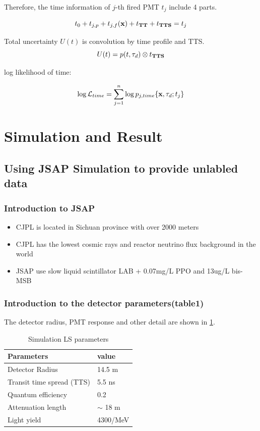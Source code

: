 \documentclass{article}
\begin{document}
	Therefore, the time information of $j$-th fired PMT $t_j$ include 4 parts. 

	\begin{equation}
	\numberwithin{equation}{section}
	t_{0} + t_{j,p} + t_{j,f}({\textbf x}) +  t_{\textbf{TT}} + t_{\textbf{TTS}}= t_{j} 
	\end{equation}	
	
	\par Total uncertainty $U(t)$ is convolution by time profile and TTS.
	\begin{equation}
	\numberwithin{equation}{section}
		U(t) =  p(t,\tau_d)\otimes t_{\textbf{TTS}}
	\end{equation}

	\par log likelihood of time:

	\begin{equation}
		\numberwithin{equation}{section}
		\log \mathcal{L}_{time} = \sum_{j=1}^n \log p_{j, time}\{{\textbf x}, \tau_d; t_{j}\}
	\end{equation}

\section{Simulation and Result}

\subsection{Using JSAP Simulation to provide unlabled data}
\subsubsection{Introduction to JSAP} 
\begin{itemize}
	\item CJPL is located in Sichuan province with over 2000 meters
	\item CJPL has the lowest cosmic rays and reactor neutrino flux background in the world
	\item JSAP use slow liquid scintillator LAB + 0.07mg/L PPO and 13ug/L bis-MSB
\end{itemize}
\subsubsection{Introduction to the detector parameters(table1)}
	The detector radius, PMT response and other detail are shown in \ref{tab:1}.
	\begin{table}[h]
	\centering
	\caption{Simulation LS parameters}
	\label{tab:1}
	\begin{tabular}{|l*{1}{l|}}
	\hline
	Parameters & value\\
	\hline
	Detector Radius & 14.5  m\\
	Transit time spread (TTS) & 5.5 ns  \\
	Quantum efficiency & 0.2 \\
	Attenuation length & $\sim$ 18 m\\
	Light yield & 4300/MeV \\
	\hline
	\end{tabular}
	\end{table}
	
\end{document}
